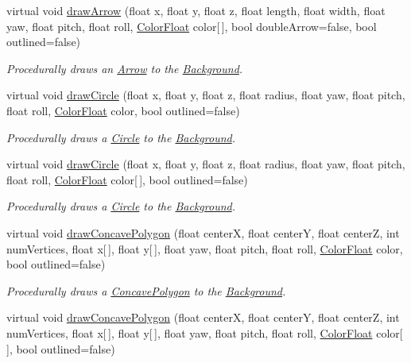 \begin{DoxyCompactItemize}
virtual void \hyperlink{classtsgl_1_1_background_a25ed7bd2cbc1f2774011b3a08d04898c}{draw\+Arrow} (float x, float y, float z, float length, float width, float yaw, float pitch, float roll, \hyperlink{structtsgl_1_1_color_float}{Color\+Float} color\mbox{[}$\,$\mbox{]}, bool double\+Arrow=false, bool outlined=false)
\begin{DoxyCompactList}\small\item\em Procedurally draws an \hyperlink{classtsgl_1_1_arrow}{Arrow} to the \hyperlink{classtsgl_1_1_background}{Background}. \end{DoxyCompactList}\item 
virtual void \hyperlink{classtsgl_1_1_background_a1aea52948e19aa340cc6a38b294291e9}{draw\+Circle} (float x, float y, float z, float radius, float yaw, float pitch, float roll, \hyperlink{structtsgl_1_1_color_float}{Color\+Float} color, bool outlined=false)
\begin{DoxyCompactList}\small\item\em Procedurally draws a \hyperlink{classtsgl_1_1_circle}{Circle} to the \hyperlink{classtsgl_1_1_background}{Background}. \end{DoxyCompactList}\item 
virtual void \hyperlink{classtsgl_1_1_background_aa9f5d0819442512216cbe6164501e306}{draw\+Circle} (float x, float y, float z, float radius, float yaw, float pitch, float roll, \hyperlink{structtsgl_1_1_color_float}{Color\+Float} color\mbox{[}$\,$\mbox{]}, bool outlined=false)
\begin{DoxyCompactList}\small\item\em Procedurally draws a \hyperlink{classtsgl_1_1_circle}{Circle} to the \hyperlink{classtsgl_1_1_background}{Background}. \end{DoxyCompactList}\item 
virtual void \hyperlink{classtsgl_1_1_background_a9ef2d3917e6a1a8187992c3e5d171639}{draw\+Concave\+Polygon} (float centerX, float centerY, float centerZ, int num\+Vertices, float x\mbox{[}$\,$\mbox{]}, float y\mbox{[}$\,$\mbox{]}, float yaw, float pitch, float roll, \hyperlink{structtsgl_1_1_color_float}{Color\+Float} color, bool outlined=false)
\begin{DoxyCompactList}\small\item\em Procedurally draws a \hyperlink{classtsgl_1_1_concave_polygon}{Concave\+Polygon} to the \hyperlink{classtsgl_1_1_background}{Background}. \end{DoxyCompactList}\item 
virtual void \hyperlink{classtsgl_1_1_background_aa465cb473087a4dc984ce89a4ffc440d}{draw\+Concave\+Polygon} (float centerX, float centerY, float centerZ, int num\+Vertices, float x\mbox{[}$\,$\mbox{]}, float y\mbox{[}$\,$\mbox{]}, float yaw, float pitch, float roll, \hyperlink{structtsgl_1_1_color_float}{Color\+Float} color\mbox{[}$\,$\mbox{]}, bool outlined=false)

\end{DoxyCompactItemize}
